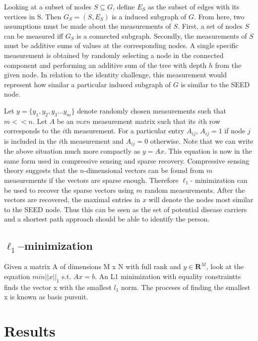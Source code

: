 \documentclass{article} %
\begin{document}
Looking at a subset of nodes  $S \subseteq G$, define $E_S$ as the subset of edges with its vertices in S. Then $G_S = (S,E_S)$ is a induced subgraph of $G$. From here, two assumptions must be made about the measurements of $S$. First, a set of nodes $S$ can be measured iff $G_S$ is a connected subgraph. Secondly, the measurements of $S$ must be additive sums of values at the corresponding nodes. A single specific measurement is obtained by randomly selecting a node in the connected component and performing an additive sum of the tree with depth $h$ from the given node. In relation to the identity challenge, this measurement would represent how similar a particular induced subgraph of $G$ is similar to the SEED node.

Let $y = \{ y_1, y_2, y_3 ... y_m \}$ denote randomly chosen measurements such that $m << n$.  Let $A$ be an $m x n$ measurement matrix such that its $i$th row corresponds to the $i$th measurement.  For a particular entry $A_{ij}$, $A_{ij} = 1$ if  node $j$ is included in the $i$th measurement and $A_{ij} = 0$ otherwise.
Note that we can write the above situation much more compactly as $y = Ax$. This equation is now in the same form used in compressive sensing and sparse recovery.  Compressive sensing theory suggests that the $n$-dimensional vectors can be found from $m$ measurements if the vectors are sparse enough. Therefore $\ell_1$- minimization can be used to recover the sparse vectors using $m$ random measurements.  After the vectors are recovered, the maximal entries in $x$  will denote the nodes most similar to the SEED node. Thus this can be seen as the set of potential disease carriers and a shortest path approach should be able to identify the person.
\subsection{$\ell_1$--minimization}
Given a matrix  A of dimensions M x N with full rank and $y \in \mathbf{R}^M$, look at the equation $min ||x||_1$ s.t. $Ax=b$. An L1 minimization with equality constraintts finds the vector x with the smallest $l_1$ norm. The proceses of finding the smallest x is known as basis pursuit.



\section{Results}
\end{document}
